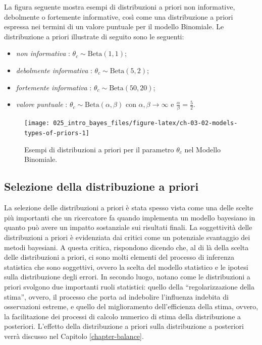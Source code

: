 \documentclass[
  10pt,
  italian,
  a4paper,
  extrafontsizes,onecolumn,openright
  ]{memoir}
\providecommand{\tightlist}{%
  \setlength{\itemsep}{0pt}\setlength{\parskip}{0pt}}
\theoremstyle{definition}
\theoremstyle{definition}
\theoremstyle{definition}
\theoremstyle{definition}
\theoremstyle{remark}
\begin{document}
La figura seguente mostra esempi di distribuzioni a priori non informative, debolmente o fortemente informative, così come una distribuzione a priori espressa nei termini di un valore puntuale per il modello Binomiale. Le distribuzione a priori illustrate di seguito sono le seguenti:

\begin{itemize}
\tightlist
\item
  \emph{non informativa} : \(\theta_c \sim \text{Beta}(1,1)\);
\item
  \emph{debolmente informativa} : \(\theta_c \sim \text{Beta}(5,2)\);
\item
  \emph{fortemente informativa} : \(\theta_c \sim \text{Beta}(50,20)\);
\item
  \emph{valore puntuale} : \(\theta_c \sim \text{Beta}(\alpha, \beta)\) con \(\alpha, \beta \rightarrow \infty\) e \(\frac{\alpha}{\beta} = \frac{5}{2}\).
\end{itemize}

\begin{figure}[h]

{\centering \texttt{[image: 025\_intro\_bayes\_files/figure-latex/ch-03-02-models-types-of-priors-1]} 

}

\caption{Esempi di distribuzioni a priori per il parametro $\theta_c$ nel Modello Binomiale.}\label{fig:ch-03-02-models-types-of-priors}
\end{figure}

\hypertarget{selezione-della-distribuzione-a-priori}{%
\subsection{Selezione della distribuzione a priori}\label{selezione-della-distribuzione-a-priori}}

La selezione delle distribuzioni a priori è stata spesso vista come una delle scelte più importanti che un ricercatore fa quando implementa un modello bayesiano in quanto può avere un impatto sostanziale sui risultati finali. La soggettività delle distribuzioni a priori è evidenziata dai critici come un potenziale svantaggio dei metodi bayesiani. A questa critica, \textcite{vandeSchoot2021modelling} rispondono dicendo che, al di là della scelta delle distribuzioni a priori, ci sono molti elementi del processo di inferenza statistica che sono soggettivi, ovvero la scelta del modello statistico e le ipotesi sulla distribuzione degli errori. In secondo luogo, \textcite{vandeSchoot2021modelling} notano come le distribuzioni a priori svolgono due importanti ruoli statistici: quello della ``regolarizzazione della stima'', ovvero, il processo che porta ad indebolire l'influenza indebita di osservazioni estreme, e quello del miglioramento dell'efficienza della stima, ovvero, la facilitazione dei processi di calcolo numerico di stima della distribuzione a posteriori. L'effetto della distribuzione a priori sulla distribuzione a posteriori verrà discusso nel Capitolo \ref{chapter-balance}.
\end{document}
